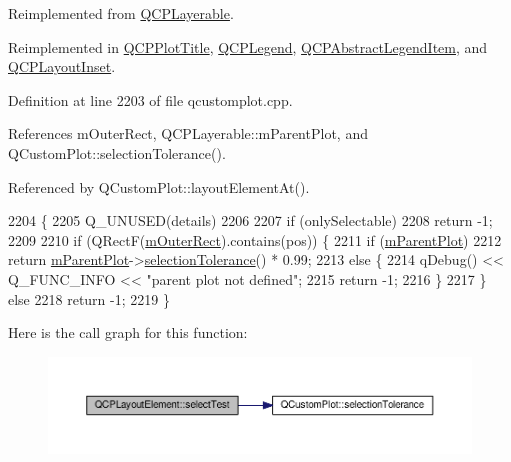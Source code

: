 Reimplemented from \hyperlink{class_q_c_p_layerable_a4001c4d0dfec55598efa4d531f2179a9}{Q\+C\+P\+Layerable}.



Reimplemented in \hyperlink{class_q_c_p_plot_title_a5b7ae716be9134a48f4e378feb0e6699}{Q\+C\+P\+Plot\+Title}, \hyperlink{class_q_c_p_legend_aa3892801051bc7b985e003576df844db}{Q\+C\+P\+Legend}, \hyperlink{class_q_c_p_abstract_legend_item_ad0480d5cad34627a294a2921caa4a62f}{Q\+C\+P\+Abstract\+Legend\+Item}, and \hyperlink{class_q_c_p_layout_inset_ab5a2f2b88c05e369fd7da9583d17aa3a}{Q\+C\+P\+Layout\+Inset}.



Definition at line 2203 of file qcustomplot.\+cpp.



References m\+Outer\+Rect, Q\+C\+P\+Layerable\+::m\+Parent\+Plot, and Q\+Custom\+Plot\+::selection\+Tolerance().



Referenced by Q\+Custom\+Plot\+::layout\+Element\+At().


\begin{DoxyCode}
2204                                                              \{
2205   Q\_UNUSED(details)
2206 
2207   if (onlySelectable)
2208     return -1;
2209 
2210   if (QRectF(\hyperlink{class_q_c_p_layout_element_a07bb4973379e75cb0fa5b032c1d24afd}{mOuterRect}).contains(pos)) \{
2211     \textcolor{keywordflow}{if} (\hyperlink{class_q_c_p_layerable_aa2a528433e44db02b8aef23c1f9f90ed}{mParentPlot})
2212       \textcolor{keywordflow}{return} \hyperlink{class_q_c_p_layerable_aa2a528433e44db02b8aef23c1f9f90ed}{mParentPlot}->\hyperlink{class_q_custom_plot_a7b738074c75e80070ef6a10263c6cd69}{selectionTolerance}() * 0.99;
2213     \textcolor{keywordflow}{else} \{
2214       qDebug() << Q\_FUNC\_INFO << \textcolor{stringliteral}{"parent plot not defined"};
2215       \textcolor{keywordflow}{return} -1;
2216     \}
2217   \} \textcolor{keywordflow}{else}
2218     \textcolor{keywordflow}{return} -1;
2219 \}
\end{DoxyCode}


Here is the call graph for this function\+:\nopagebreak
\begin{figure}[H]
\begin{center}
\leavevmode
\includegraphics[width=350pt]{class_q_c_p_layout_element_a9fcf5d0ea19f2c23b2b528bce2c6f095_cgraph}
\end{center}
\end{figure}




